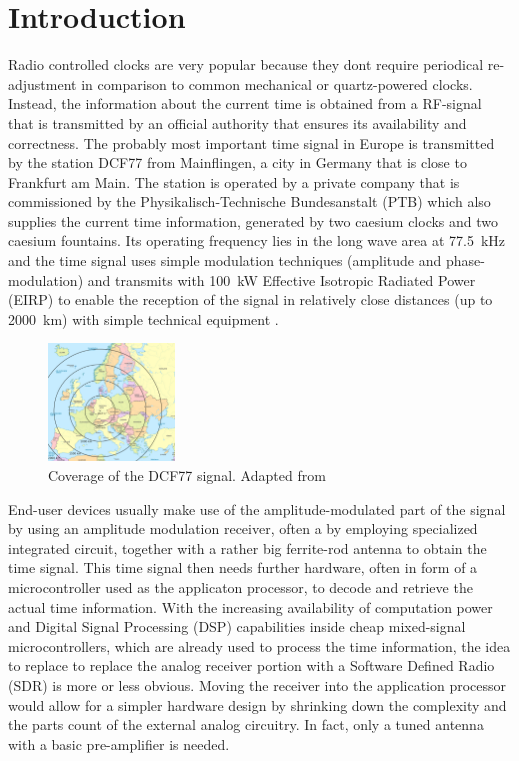 \documentclass[conference]{IEEEtran}
\begin{document}
\section{Introduction}
Radio controlled clocks are very popular because they dont require periodical re-adjustment in comparison to common mechanical or quartz-powered clocks.
Instead, the information about the current time is obtained from a RF-signal that is transmitted by an official authority that ensures its availability and
correctness.
The probably most important time signal in Europe is transmitted by the station DCF77 from Mainflingen, a city in Germany that is close to Frankfurt am Main.
The station is operated by a private company that is commissioned by the Physikalisch-Technische Bundesanstalt (PTB) which also supplies the current time information,
generated by two caesium clocks and two caesium fountains. Its operating frequency lies in the long wave area at \SI{77.5}{\kilo\hertz} and the time signal
uses simple modulation techniques (amplitude and phase-modulation) and transmits with \SI{100}{\kilo\watt} Effective Isotropic Radiated Power (EIRP) to enable the reception of the
signal in relatively close distances (up to \SI{2000}{\kilo\meter}) with simple technical equipment \cite{b2}.
\begin{figure}[!htbp]
    \centerline{\includegraphics[width=0.3\textwidth]{img/dcf77_range.jpg}}
    \caption{Coverage of the DCF77 signal. Adapted from \cite{b1}}
    \label{fig:dcf77_range}
\end{figure}
\FloatBarrier
End-user devices usually make use of the amplitude-modulated part of the signal by using an amplitude modulation receiver, often a by employing specialized integrated circuit,
together with a rather big ferrite-rod antenna to obtain the time signal.
This time signal then needs further hardware, often in form of a microcontroller used as the applicaton processor, to decode and retrieve the actual time information.
With the increasing availability of computation power and Digital Signal Processing (DSP) capabilities inside cheap mixed-signal microcontrollers, which are already used
to process the time information, the idea to replace to replace the analog receiver portion with a Software Defined Radio (SDR) is more or less obvious.
Moving the receiver into the application processor would allow for a simpler hardware design by shrinking down the complexity and the parts count of the
external analog circuitry. In fact, only a tuned antenna with a basic pre-amplifier is needed.
\end{document}
